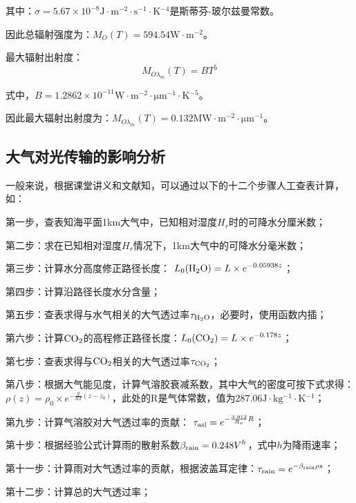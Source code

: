 \documentclass[11pt]{article}
\begin{document}
其中：$\sigma=5.67\times 10^{-8} \unit{\J\cdot\m^{-2}\cdot \s^{-1}\cdot \K^{-4}}$是斯蒂芬-玻尔兹曼常数。\par
因此总辐射强度为：$M_O(T)=594.54\unit{\W\cdot \m^{-2}}$。\par
最大辐射出射度：
\begin{equation}
  M_{O\lambda_m}(T)=BT^5
  \label{forem:最大辐出度公式}
\end{equation}

式中，$B= 1.2862\times 10^{-11}\unit{\W\cdot \m^{-2}\cdot \um^{-1}\cdot \K^{-5}}$。\par
因此最大辐射出射度为：$M_{O\lambda_m}(T)=0.132\unit{\MW\cdot \m^{-2}\cdot \um^{-1}}$。
\subsection{大气对光传输的影响分析}
一般来说，根据课堂讲义\cite*{hand_up}和文献\cite*{optical_electrical_photography}知，可以通过以下的十二个步骤人工查表计算，如：\par
第一步，查表知海平面1\unit{\km}大气中，已知相对湿度$H_r$时的可降水分厘米数；\par
第二步：求在已知相对湿度$H_r$情况下，1km大气中的可降水分毫米数；\par
第三步：计算水分高度修正路径长度： $ \displaystyle L_0({\rm H_2O})  =L\times e^{-0.05938z} $；\par
第四步：计算沿路径长度水分含量；\par
第五步：查表求得与水气相关的大气透过率$\tau_{\rm H_2O}$，必要时，使用函数内插；\par
第六步：计算$\rm CO_2$的高程修正路径长度：$\displaystyle L_0({\rm CO_2})  =L\times e^{-0.178z}  $；\par
第七步：查表求得与$\rm CO_2$相关的大气透过率$\tau_{\rm CO_2}$；\par
第八步：根据大气能见度，计算气溶胶衰减系数，其中大气的密度可按下式求得：$\displaystyle\rho(z)  =\rho_0\times e^{-\frac{g}{RT}(z-z_0)} $，此处的R是气体常数，值为$287.06\unit{\J\cdot\kg^{-1}\cdot\K^{-1}}$；\par
第九步：计算气溶胶对大气透过率的贡献：
$\displaystyle\tau_{\rm asl}=e^{-\frac{3.912}{R_v}R}$；\par
第十步：根据经验公式计算雨的散射系数$\displaystyle\beta_{\rm rain}=0.248V^{h}$，式中$h$为降雨速率；\par
第十一步：计算雨对大气透过率的贡献，根据波盖耳定律：$\displaystyle\tau_{\rm rain} =e^{-\beta_{\rm rain}\rho s}$；\par
第十二步：计算总的大气透过率；\par
\end{document}
